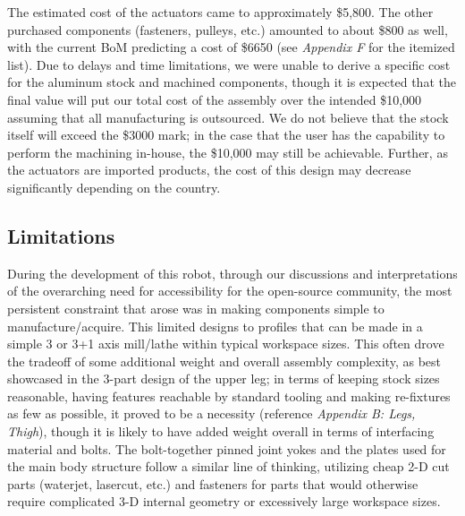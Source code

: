 \documentclass{article}
\begin{document}
The estimated cost of the actuators came to approximately \$5,800. The other purchased components (fasteners, pulleys, etc.) amounted to about \$800 as well, with the current BoM predicting a cost of \$6650 (see \textit{Appendix F} for the itemized list). Due to delays and time limitations, we were unable to derive a specific cost for the aluminum stock and machined components, though it is expected that the final value will put our total cost of the assembly over the intended \$10,000 assuming that all manufacturing is outsourced. We do not believe that the stock itself will exceed the \$3000 mark; in the case that the user has the capability to perform the machining in-house, the \$10,000 may still be achievable. Further, as the actuators are imported products, the cost of this design may decrease significantly depending on the country.

\subsection{Limitations}
During the development of this robot, through our discussions and interpretations of the overarching need for accessibility for the open-source community, the most persistent constraint that arose was in making components simple to manufacture/acquire. This limited designs to profiles that can be made in a simple 3 or 3+1 axis mill/lathe within typical workspace sizes. This often drove the tradeoff of some additional weight and overall assembly complexity, as best showcased in the 3-part design of the upper leg; in terms of keeping stock sizes reasonable, having features reachable by standard tooling and making re-fixtures as few as possible, it proved to be a necessity (reference \textit{Appendix B: Legs, Thigh}), though it is likely to have added weight overall in terms of interfacing material and bolts. The bolt-together pinned joint yokes and the plates used for the main body structure follow a similar line of thinking, utilizing cheap 2-D cut parts (waterjet, lasercut, etc.) and fasteners for parts that would otherwise require complicated 3-D internal geometry or excessively large workspace sizes. 
\end{document}
